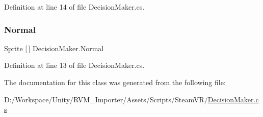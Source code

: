 Definition at line 14 of file Decision\+Maker.\+cs.

\mbox{\label{class_decision_maker_ad5083f304d1a00f98982ef9154123fd9}} 
\subsubsection{\texorpdfstring{Normal}{Normal}}
{\footnotesize\ttfamily Sprite \mbox{[}$\,$\mbox{]} Decision\+Maker.\+Normal}



Definition at line 13 of file Decision\+Maker.\+cs.



The documentation for this class was generated from the following file\+:\begin{DoxyCompactItemize}
\item 
D\+:/\+Workspace/\+Unity/\+R\+V\+M\+\_\+\+Importer/\+Assets/\+Scripts/\+Steam\+V\+R/\mbox{\hyperlink{_decision_maker_8cs}{Decision\+Maker.\+cs}}\end{DoxyCompactItemize}
